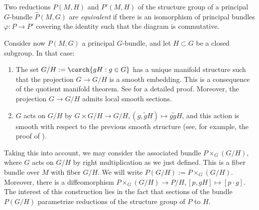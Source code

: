 \noindent
\begin{minipage}{0.75\textwidth}
    Two reductions \(P(M, H)\) and \(P'(M, H)\) of the structure group of a principal \(G\)-bundle \(\hat{P}(M,G)\) are \textit{equivalent} if there is an isomorphism of principal bundles \(\varphi\colon P\to P'\) covering the identity such that the diagram is commutative.
\end{minipage}
\begin{minipage}{0.24\textwidth}
    \begin{center}
    \end{center}
\end{minipage}

Consider now \(P(M,G)\) a principal \(G\)-bundle, and let \(H \subset G\) be a closed subgroup. In that case:
\begin{enumerate}
    \item The set \(G/H:=\corch{gH: g \in G}\) has a unique manifold structure such that the projection \(G \to G/H\) is a smooth embedding. This is a consequence of the quotient manifold theorem. See \parencite[Th. 21.17]{lee_introSM} for a detailed proof. Moreover, the projection \(G \to G/H\) admits local smooth sections.
    \item \(G\) acts on \(G/H\) by \(G \times G/H \to G/H, (g, \tilde{g}H) \mapsto g\tilde{g} H\), and this action is smooth with respect to the previous smooth structure (see, for example, the proof of \parencite[Th. 21.17]{lee_introSM}).  
\end{enumerate}

Taking this into account, we may consider the associated bundle \(P \times _G (G/H)\), where \(G\) acts on \(G/H\) by right multiplication as we just defined. This is a fiber bundle over \(M\) with fiber \(G/H\). We will write \(P(G/H):=P\times_G (G/H)\). Moreover, there is a diffeomorphism \(P\times_G(G/H) \to P/H, [p, gH] \mapsto [p\cdot g]\). The interest of this construction lies in the fact that sections of the bundle \(P(G/H)\) parametrize reductions of the structure group of \(P\) to \(H\).

